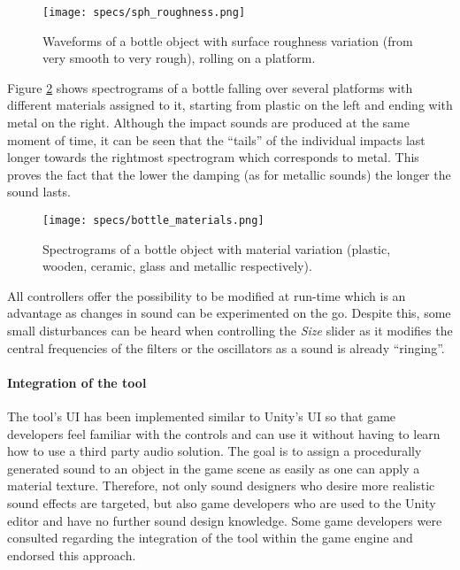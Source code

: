 \begin{figure}[H]
  \centering
    \texttt{[image: specs/sph\_roughness.png]}
      \caption{Waveforms of a bottle object with surface roughness variation (from very smooth to very rough), rolling on a platform.}
      \label{fig:bottle_rough}
\end{figure}

Figure \ref{fig:bottle_materials} shows spectrograms of a bottle falling over several platforms with different materials assigned to it, starting from plastic on the left and ending with metal on the right. Although the impact sounds are produced at the same moment of time, it can be seen that the ``tails'' of the individual impacts last longer towards the rightmost spectrogram which corresponds to metal. This proves the fact that the lower the damping (as for metallic sounds) the longer the sound lasts.

\begin{figure}[H]
  \centering
    \texttt{[image: specs/bottle\_materials.png]}
      \caption{Spectrograms of a bottle object with material variation (plastic, wooden, ceramic, glass and metallic respectively).}
      \label{fig:bottle_materials}
\end{figure}

All controllers offer the possibility to be modified at run-time which is an advantage as changes in sound can be experimented on the go. Despite this, some small disturbances can be heard when controlling the \textit{Size} slider as it modifies the central frequencies of the filters or the oscillators as a sound is already ``ringing''.

\paragraph{Integration of the tool}
\hfill \break

The tool's \gls{UI} has been implemented similar to Unity\textsuperscript{\textregistered}'s \gls{UI} so that game developers feel familiar with the controls and can use it without having to learn how to use a third party audio solution. The goal is to assign a procedurally generated sound to an object in the game scene as easily  as one can apply a material texture. Therefore, not only sound designers who desire more realistic sound effects are targeted, but also game developers who are used to the Unity\textsuperscript{\textregistered} editor and have no further sound design knowledge. Some game developers were consulted regarding the integration of the tool within the game engine and endorsed this approach.

